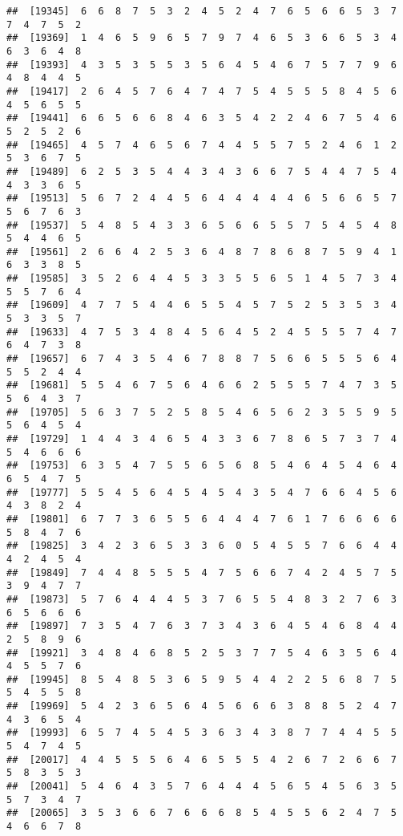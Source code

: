 \documentclass[
]{book}
\begin{document}
\begin{verbatim}
##  [19345]  6  6  8  7  5  3  2  4  5  2  4  7  6  5  6  6  5  3  7  7  4  7  5  2
##  [19369]  1  4  6  5  9  6  5  7  9  7  4  6  5  3  6  6  5  3  4  6  3  6  4  8
##  [19393]  4  3  5  3  5  5  3  5  6  4  5  4  6  7  5  7  7  9  6  4  8  4  4  5
##  [19417]  2  6  4  5  7  6  4  7  4  7  5  4  5  5  5  8  4  5  6  4  5  6  5  5
##  [19441]  6  6  5  6  6  8  4  6  3  5  4  2  2  4  6  7  5  4  6  5  2  5  2  6
##  [19465]  4  5  7  4  6  5  6  7  4  4  5  5  7  5  2  4  6  1  2  5  3  6  7  5
##  [19489]  6  2  5  3  5  4  4  3  4  3  6  6  7  5  4  4  7  5  4  4  3  3  6  5
##  [19513]  5  6  7  2  4  4  5  6  4  4  4  4  4  6  5  6  6  5  7  5  6  7  6  3
##  [19537]  5  4  8  5  4  3  3  6  5  6  6  5  5  7  5  4  5  4  8  5  4  4  6  5
##  [19561]  2  6  6  4  2  5  3  6  4  8  7  8  6  8  7  5  9  4  1  6  3  3  8  5
##  [19585]  3  5  2  6  4  4  5  3  3  5  5  6  5  1  4  5  7  3  4  5  5  7  6  4
##  [19609]  4  7  7  5  4  4  6  5  5  4  5  7  5  2  5  3  5  3  4  5  3  3  5  7
##  [19633]  4  7  5  3  4  8  4  5  6  4  5  2  4  5  5  5  7  4  7  6  4  7  3  8
##  [19657]  6  7  4  3  5  4  6  7  8  8  7  5  6  6  5  5  5  6  4  5  5  2  4  4
##  [19681]  5  5  4  6  7  5  6  4  6  6  2  5  5  5  7  4  7  3  5  5  6  4  3  7
##  [19705]  5  6  3  7  5  2  5  8  5  4  6  5  6  2  3  5  5  9  5  5  6  4  5  4
##  [19729]  1  4  4  3  4  6  5  4  3  3  6  7  8  6  5  7  3  7  4  5  4  6  6  6
##  [19753]  6  3  5  4  7  5  5  6  5  6  8  5  4  6  4  5  4  6  4  6  5  4  7  5
##  [19777]  5  5  4  5  6  4  5  4  5  4  3  5  4  7  6  6  4  5  6  4  3  8  2  4
##  [19801]  6  7  7  3  6  5  5  6  4  4  4  7  6  1  7  6  6  6  6  5  8  4  7  6
##  [19825]  3  4  2  3  6  5  3  3  6  0  5  4  5  5  7  6  6  4  4  4  2  4  5  4
##  [19849]  7  4  4  8  5  5  5  4  7  5  6  6  7  4  2  4  5  7  5  3  9  4  7  7
##  [19873]  5  7  6  4  4  4  5  3  7  6  5  5  4  8  3  2  7  6  3  6  5  6  6  6
##  [19897]  7  3  5  4  7  6  3  7  3  4  3  6  4  5  4  6  8  4  4  2  5  8  9  6
##  [19921]  3  4  8  4  6  8  5  2  5  3  7  7  5  4  6  3  5  6  4  4  5  5  7  6
##  [19945]  8  5  4  8  5  3  6  5  9  5  4  4  2  2  5  6  8  7  5  5  4  5  5  8
##  [19969]  5  4  2  3  6  5  6  4  5  6  6  6  3  8  8  5  2  4  7  4  3  6  5  4
##  [19993]  6  5  7  4  5  4  5  3  6  3  4  3  8  7  7  4  4  5  5  5  4  7  4  5
##  [20017]  4  4  5  5  5  6  4  6  5  5  5  4  2  6  7  2  6  6  7  5  8  3  5  3
##  [20041]  5  4  6  4  3  5  7  6  4  4  4  5  6  5  4  5  6  3  5  5  7  3  4  7
##  [20065]  3  5  3  6  6  7  6  6  6  8  5  4  5  5  6  2  4  7  5  4  6  6  7  8

\end{verbatim}
\end{document}
